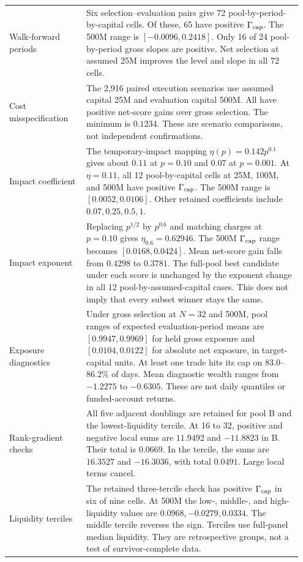 \documentclass[10pt,letterpaper]{article}
\begin{document}
\begin{longtable}{@{}p{0.25\linewidth}p{0.70\linewidth}@{}}
Walk-forward periods & Six selection--evaluation pairs give 72 pool-by-period-by-capital cells. Of these, 65 have positive $\Gamma_{\rm cap}$. The 500M range is $[-0.0096,0.2418]$. Only 16 of 24 pool-by-period gross slopes are positive. Net selection at assumed 25M improves the level and slope in all 72 cells.\\
Cost misspecification & The 2,916 paired execution scenarios use assumed capital 25M and evaluation capital 500M. All have positive net-score gains over gross selection. The minimum is $0.1234$. These are scenario comparisons, not independent confirmations.\\
Impact coefficient & The temporary-impact mapping $\eta(p)=0.142p^{0.1}$ gives about $0.11$ at $p=0.10$ and $0.07$ at $p=0.001$. At $\eta=0.11$, all 12 pool-by-capital cells at 25M, 100M, and 500M have positive $\Gamma_{\rm cap}$. The 500M range is $[0.0052,0.0106]$. Other retained coefficients include $0.07,0.25,0.5,1$.\\
Impact exponent & Replacing $p^{1/2}$ by $p^{0.6}$ and matching charges at $p=0.10$ gives $\eta_{0.6}=0.62946$. The 500M $\Gamma_{\rm cap}$ range becomes $[0.0168,0.0424]$. Mean net-score gain falls from $0.4298$ to $0.3781$. The full-pool best candidate under each score is unchanged by the exponent change in all 12 pool-by-assumed-capital cases. This does not imply that every subset winner stays the same.\\
Exposure diagnostics & Under gross selection at $N=32$ and 500M, pool ranges of expected evaluation-period means are $[0.9947,0.9969]$ for held gross exposure and $[0.0104,0.0122]$ for absolute net exposure, in target-capital units. At least one trade hits its cap on $83.0$--$86.2\%$ of days. Mean diagnostic wealth ranges from $-1.2275$ to $-0.6305$. These are not daily quantiles or funded-account returns.\\
Rank-gradient checks & All five adjacent doublings are retained for pool B and the lowest-liquidity tercile. At 16 to 32, positive and negative local sums are $11.9492$ and $-11.8823$ in B. Their total is $0.0669$. In the tercile, the sums are $16.3527$ and $-16.3036$, with total $0.0491$. Large local terms cancel.\\
Liquidity terciles & The retained three-tercile check has positive $\Gamma_{\rm cap}$ in six of nine cells. At 500M the low-, middle-, and high-liquidity values are $0.0968,-0.0279,0.0334$. The middle tercile reverses the sign. Terciles use full-panel median liquidity. They are retrospective groups, not a test of survivor-complete data.\\

\end{longtable}
\end{document}
